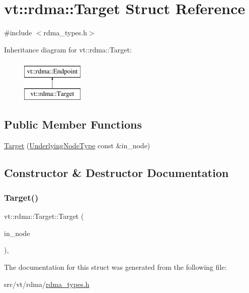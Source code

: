 \hypertarget{structvt_1_1rdma_1_1_target}{}\section{vt\+:\+:rdma\+:\+:Target Struct Reference}
\label{structvt_1_1rdma_1_1_target}


{\ttfamily \#include $<$rdma\+\_\+types.\+h$>$}

Inheritance diagram for vt\+:\+:rdma\+:\+:Target\+:\begin{figure}[H]
\begin{center}
\leavevmode
\includegraphics[height=2.000000cm]{structvt_1_1rdma_1_1_target}
\end{center}
\end{figure}
\subsection*{Public Member Functions}
\begin{DoxyCompactItemize}
\item 
\hyperlink{structvt_1_1rdma_1_1_target_aa8706bac5173539fac227620fb7902b5}{Target} (\hyperlink{namespacevt_1_1rdma_a20d01bc82b95453c162d4b9857a4a78a}{Underlying\+Node\+Type} const \&in\+\_\+node)
\end{DoxyCompactItemize}


\subsection{Constructor \& Destructor Documentation}
\mbox{\label{structvt_1_1rdma_1_1_target_aa8706bac5173539fac227620fb7902b5}} 
\subsubsection{\texorpdfstring{Target()}{Target()}}
{\footnotesize\ttfamily vt\+::rdma\+::\+Target\+::\+Target (\begin{DoxyParamCaption}\item[{\hyperlink{namespacevt_1_1rdma_a20d01bc82b95453c162d4b9857a4a78a}{Underlying\+Node\+Type} const \&}]{in\+\_\+node }\end{DoxyParamCaption})\hspace{0.3cm}{\ttfamily [inline]}, {\ttfamily [explicit]}}



The documentation for this struct was generated from the following file\+:\begin{DoxyCompactItemize}
\item 
src/vt/rdma/\hyperlink{rdma__types_8h}{rdma\+\_\+types.\+h}\end{DoxyCompactItemize}

